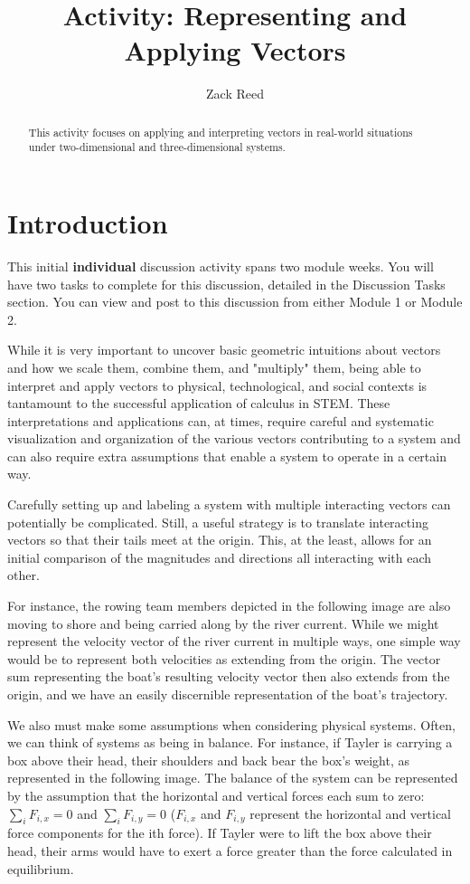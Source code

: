 \documentclass{ximera}
\title{Activity: Representing and Applying Vectors}
\author{Zack Reed}
\begin{document}
\begin{abstract}
This  activity focuses on applying and interpreting vectors in real-world situations under two-dimensional and three-dimensional systems.
\end{abstract}
\maketitle


\section*{Introduction}

This initial \textbf{individual} discussion activity spans two module weeks. You will have two tasks to complete for this discussion, detailed in the Discussion Tasks section. You can view and post to this discussion from either Module 1 or Module 2.

While it is very important to uncover basic geometric intuitions about vectors and how we scale them, combine them, and "multiply" them, being able to interpret and apply vectors to physical, technological, and social contexts is tantamount to the successful application of calculus in STEM. These interpretations and applications can, at times, require careful and systematic visualization and organization of the various vectors contributing to a system and can also require extra assumptions that enable a system to operate in a certain way.

Carefully setting up and labeling a system with multiple interacting vectors can potentially be complicated. Still, a useful strategy is to translate interacting vectors so that their tails meet at the origin. This, at the least, allows for an initial comparison of the magnitudes and directions all interacting with each other.

For instance, the rowing team members depicted in the following image are also moving to shore and being carried along by the river current. While we might represent the velocity vector of the river current in multiple ways, one simple way would be to represent both velocities as extending from the origin. The vector sum representing the boat's resulting velocity vector then also extends from the origin, and we have an easily discernible representation of the boat's trajectory.


We also must make some assumptions when considering physical systems. Often, we can think of systems as being in balance. For instance, if Tayler is carrying a box above their head, their shoulders and back bear the box's weight, as represented in the following image. The balance of the system can be represented by the assumption that the horizontal and vertical forces each sum to zero: $\sum_iF_{i,x}=0$ and $\sum_iF_{i,y}=0$ ($F_{i,x}$ and $F_{i,y}$ represent the horizontal and vertical force components for the ith force). If Tayler were to lift the box above their head, their arms would have to exert a force greater than the force calculated in equilibrium.
\end{document}
